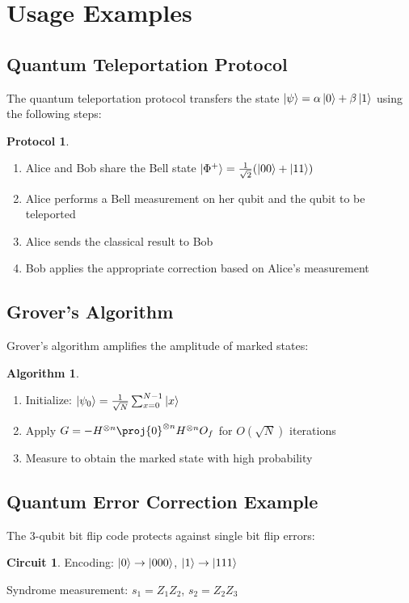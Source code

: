 \documentclass[12pt]{article}
\newcommand{\qzero}{\ket{0}}
\newcommand{\qone}{\ket{1}}
\newcommand{\qpsi}{\ket{\psi}}
\newcommand{\bellphi}{\ket{\Phi^+}}
\newcommand{\hadamard}{H}
\newcommand{\tensor}{\otimes}
\newcommand{\oraclef}{O_f}
\theoremstyle{definition}
\newtheorem{algorithm}{Algorithm}[section]
\newtheorem{protocol}{Protocol}[section]
\newtheorem{circuit}{Circuit}[section]
\theoremstyle{remark}
\begin{document}
\section{Usage Examples}

\subsection{Quantum Teleportation Protocol}
The quantum teleportation protocol transfers the state $\qpsi = \alpha\qzero + \beta\qone$ using the following steps:

\begin{protocol}
\begin{enumerate}
\item Alice and Bob share the Bell state $\bellphi = \frac{1}{\sqrt{2}}(\ket{00} + \ket{11})$
\item Alice performs a Bell measurement on her qubit and the qubit to be teleported
\item Alice sends the classical result to Bob
\item Bob applies the appropriate correction based on Alice's measurement
\end{enumerate}
\end{protocol}

\subsection{Grover's Algorithm}
Grover's algorithm amplifies the amplitude of marked states:

\begin{algorithm}
\begin{enumerate}
\item Initialize: $\ket{\psi_0} = \frac{1}{\sqrt{N}}\sum_{x=0}^{N-1}\ket{x}$
\item Apply $G = -\hadamard^{\tensor n}\proj{0}^{\tensor n}\hadamard^{\tensor n}\oraclef$ for $O(\sqrt{N})$ iterations
\item Measure to obtain the marked state with high probability
\end{enumerate}
\end{algorithm}

\subsection{Quantum Error Correction Example}
The 3-qubit bit flip code protects against single bit flip errors:

\begin{circuit}
Encoding: $\ket{0} \rightarrow \ket{000}$, $\ket{1} \rightarrow \ket{111}$

Syndrome measurement: $s_1 = Z_1Z_2$, $s_2 = Z_2Z_3$
\end{circuit}
\end{document}
